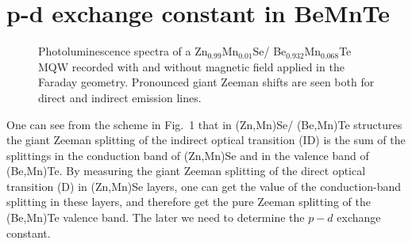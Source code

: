 \documentclass[a4paper,draft]{book}
\begin{document}
\section {p{-}d exchange constant in BeMnTe}
\begin{figure}[b]
\leavevmode {}
\caption[]{Photoluminescence spectra of a
Zn$_{0.99}$Mn$_{0.01}$Se/ Be$_{0.932}$Mn$_{0.068}$Te MQW recorded
with and without magnetic field applied in the Faraday geometry.
Pronounced giant Zeeman shifts are seen both for direct and
indirect emission lines.}
\end{figure}

One can see from the scheme in Fig.~1 that in (Zn,Mn)Se/ (Be,Mn)Te
structures the giant Zeeman splitting of the indirect optical
transition (ID) is the sum of the splittings in the conduction
band of (Zn,Mn)Se and in the valence band of (Be,Mn)Te.
By measuring the giant Zeeman splitting of the direct optical
transition (D) in (Zn,Mn)Se layers, one can get the value of the
conduction-band splitting in these layers, and therefore get the
pure Zeeman splitting of the (Be,Mn)Te valence band.
The later we need to determine the $p{-}d$ exchange constant.
\end{document}
